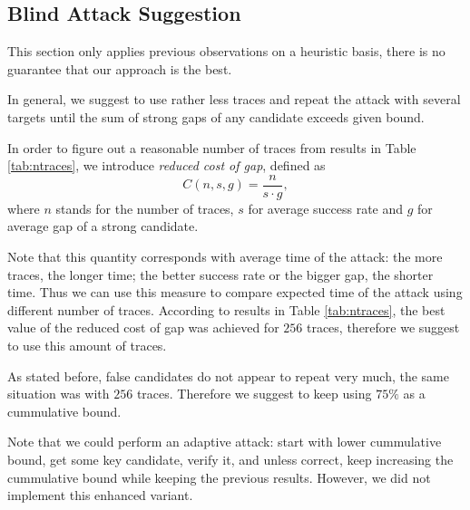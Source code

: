 \subsection{Blind Attack Suggestion}
\label{sec:subblindattack}

\begin{note}
	This section only applies previous observations on a heuristic basis, there is no guarantee that our approach is the best.
\end{note}

In general, we suggest to use rather less traces and repeat the attack with several targets until the sum of strong gaps of any candidate exceeds given bound.

In order to figure out a reasonable number of traces from results in Table \ref{tab:ntraces}, we introduce {\em reduced cost of gap}, defined as
\begin{equation}
\label{eq:redcost}
	C(n, s, g) = \frac{n}{s\cdot g} ,
\end{equation}
where $n$ stands for the number of traces, $s$ for average success rate and $g$ for average gap of a strong candidate.

Note that this quantity corresponds with average time of the attack: the more traces, the longer time; the better success rate or the bigger gap, the shorter time. Thus we can use this measure to compare expected time of the attack using different number of traces. According to results in Table \ref{tab:ntraces}, the best value of the reduced cost of gap was achieved for $256$ traces, therefore we suggest to use this amount of traces.

As stated before, %
false candidates do not appear to repeat very much, the same situation was with $256$ traces. Therefore we suggest to keep using $75\%$ as a cummulative bound.

Note that we could perform an adaptive attack: start with lower cummulative bound, get some key candidate, verify it, and unless correct, keep increasing the cummulative bound while keeping the previous results. However, we did not implement this enhanced variant.

